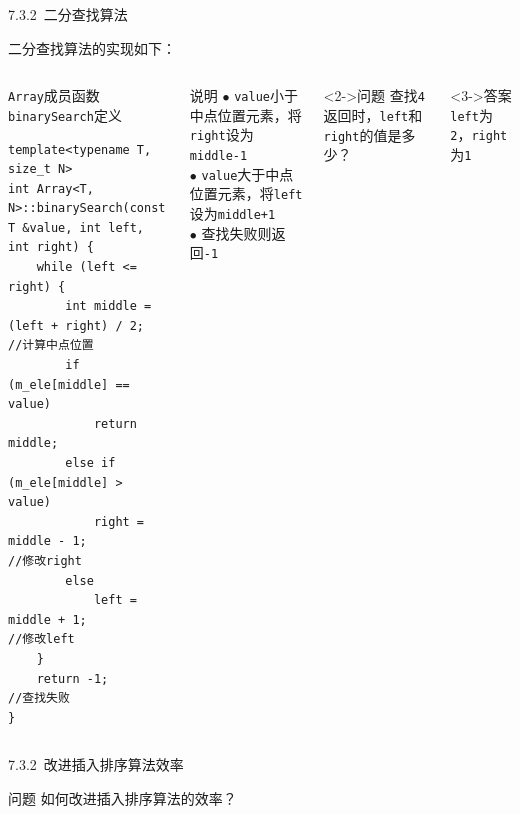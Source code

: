 \begin{frame}[fragile]{7.3.2~二分查找算法}

二分查找算法的实现如下：

\vspace{-4mm}

\begin{columns}[t]

\begin{blueblock}{\texttt{Array}成员函数\texttt{binarySearch}定义}
\begin{lstlisting}[moreemph={Array,T,F}]
template<typename T, size_t N>
int Array<T, N>::binarySearch(const T &value, int left, int right) {
    while (left <= right) {
        int middle = (left + right) / 2;    //计算中点位置
        if (m_ele[middle] == value)
            return middle;
        else if (m_ele[middle] > value)
            right = middle - 1;             //修改right
        else
            left = middle + 1;              //修改left
    }
    return -1;                              //查找失败
}
\end{lstlisting}
\end{blueblock}


\begin{yellowblock}{说明}
$\bullet$ \texttt{value}小于中点位置元素，将\texttt{right}设为\texttt{middle-1}\\
$\bullet$ \texttt{value}大于中点位置元素，将\texttt{left}设为\texttt{middle+1}\\
$\bullet$ 查找失败则返回\texttt{-1}
\end{yellowblock}
\vspace{-2mm}
\begin{greenblock}<2->{问题}
查找\texttt{4}返回时，\texttt{left}和\texttt{right}的值是多少？
\end{greenblock}
\vspace{-2mm}
\begin{greenblock}<3->{答案}
\texttt{left}为\texttt{2}，\texttt{right}为\texttt{1}
\end{greenblock}

\end{columns}

\end{frame}


\begin{frame}[fragile]{7.3.2~改进插入排序算法效率}

\begin{greenblock}{问题}
如何改进插入排序算法的效率？
\end{greenblock}

\end{frame}
